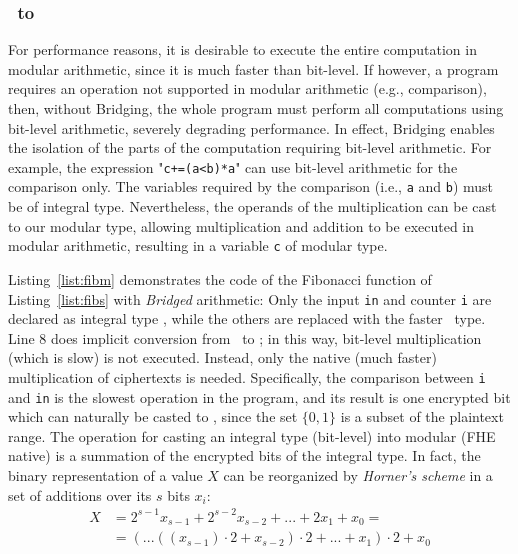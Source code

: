 
\subsubsection{\secuint\ to \secmod{}}\label{sss:secuint2secmod}

For performance reasons, it is desirable to execute the entire computation in modular arithmetic, since it is much faster than bit-level. If however, a program requires an operation not supported in modular arithmetic (e.g., comparison), then, without Bridging, the whole program must perform all computations using bit-level arithmetic, severely degrading performance. 
In effect, Bridging enables the isolation of the parts of the computation requiring bit-level arithmetic.
For example, the expression "{\tt{}c+=(a<b)*a}" can use bit-level arithmetic for the comparison only.
The variables required by the comparison (i.e., \texttt{a} and \texttt{b}) must be of integral type. Nevertheless, the operands of the multiplication can be cast to our modular type, allowing multiplication and addition to be executed in modular arithmetic, resulting in a variable {\tt{}c} of modular type.



Listing~\ref{list:fibm} demonstrates the code of the Fibonacci function of Listing~\ref{list:fibs} with \emph{Bridged} arithmetic: Only the input \texttt{in} and counter \texttt{i} are declared as integral type \secuint{}, while the others are replaced with the faster \secmod\ type. 
Line 8 does implicit conversion from \secuint\ to \secmod;
in this way, bit-level multiplication (which is slow) is not executed. Instead, only the native (much faster) multiplication of ciphertexts is needed.
Specifically, the comparison between {\tt i} and {\tt in} is the slowest operation in the program, and its result is one encrypted bit which can naturally be casted to \secmod, since the set $\{0,1\}$ is a subset of the plaintext range.
The operation for casting an integral type (bit-level) into modular (FHE native) is a summation of the encrypted bits of the integral type. 
In fact, the binary representation of a value $X$ can be reorganized by {\it Horner's scheme} in a set of additions over its $s$ bits $x_i$:
\begin{equation*}
\begin{split}
X & = 2^{s-1}x_{s-1} +2^{s-2}x_{s-2} + ... + 2x_1+x_0 = \\
& =(...((x_{s-1})\cdot 2+x_{s-2})\cdot 2+...+x_1)\cdot 2+x_0
\end{split}
\end{equation*}


